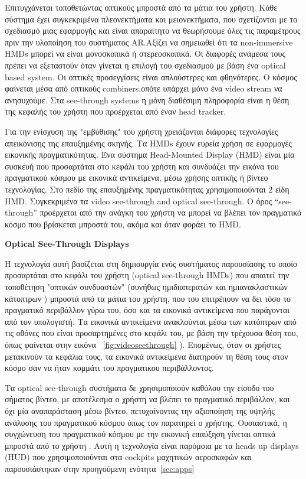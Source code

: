 Επιτυγχάνεται τοποθετώντας οπτικούς μπροστά από τα μάτια του χρήστη. Κάθε σύστημα έχει συγκεκριμένα πλεονεκτήματα και μειονεκτήματα, που σχετίζονται με το σχεδιασμό μιας εφαρμογής και είναι απαραίτητο  να θεωρήσουμε όλες τις παραμέτρους πριν την υλοποίηση του συστήματος AR.Αξίζει να σημειωθεί ότι τα non-immersive HMDs μπορεί να είναι μονοσκοπικά ή στερεοσκοπικά. Οι διαφορές ανάμεσα τους πρέπει να εξεταστούν όταν γίνεται η επιλογή του σχεδιασμού με βάση ένα optical based system. Οι οπτικές προσεγγίσεις είναι απλούστερες και φθηνότερες. Ο κόσμος φαίνεται μέσα από οπτικούς combiners,οπότε υπάρχει μόνο ένα video stream να ανησυχούμε. Στα see-through systems η μόνη διαθέσιμη πληροφορία είναι η θέση της κεφαλής του χρήστη που προέρχεται από έναν head tracker. 



Για την ενίσχυση της "εμβύθισης" του χρήστη χρειάζονται διάφορες τεχνολογίες απεικόνισης της επαυξημένης σκηνής. Τα HMDs έχουν ευρεία χρήση σε εφαρμογές εικονικής πραγματικότητας. Ένα σύστημα Head-Mounted Display (HMD) είναι μία συσκευή που προσαρτάται στο κεφάλι του χρήστη και συνδυάζει την εικόνα του πραγματικού κόσμου με εικονικά αντικείμενα, μέσω χρήσης οπτικής ή βίντεο τεχνολογίας. 
Στο πεδίο της επαυξημένης πραγματικότητας χρησιμοποιούνται 2 είδη HMD. Συγκεκριμένα τα video see-through and optical see-through. Ο όρος “see-through” προέρχεται από την ανάγκη του χρήστη να μπορεί να βλέπει τον πραγματικό κόσμο που βρίσκεται μπροστά του, ακόμα και όταν φοράει το HMD.

 
\textbf{Optical See-Through Displays}


Η τεχνολογία αυτή βασίζεται στη δημιουργία ενός συστήματος παρουσίασης το οποίο προσαρτάται στο κεφάλι του χρήστη (optical see-through HMDs) που απαιτεί την τοποθέτηση "οπτικών συνδυαστών" (συνήθως ημιδιαπερατών και ημιανακλαστικών κάτοπτρων ) μπροστά από τα μάτια του χρήστη, που του επιτρέπουν να δει τόσο το πραγματικό περιβάλλον γύρω του, όσο και τα εικονικά αντικείμενα που παράγονται από τον υπολογιστή. 
Τα εικονικά αντικείμενα ανακλούνται μέσω των κατόπτρων από τις οθόνες που είναι προσαρτημένες στο κεφάλι του, με βάση την τρέχουσα θέση του, όπως φαίνεται στην εικόνα ~\ref{fig:videoseethrough} ).  Επομένως, όταν οι χρήστες μετακινούν τα κεφάλια τους, τα εικονικά αντικείμενα διατηρούν τη θέση τους στον κόσμο σαν να ήταν κομμάτι του πραγματικου περιβάλλοντος.



Τα optical see-through συστήματα δε χρησιμοποιούν καθόλου την είσοδο του σήματος βίντεο, με αποτέλεσμα ο χρήστη να βλέπει το πραγματικό περιβάλλον, και όχι μία αναπαράσταση μέσω βίντεο, πετυχαίνοντας την αξιοποίηση της υψηλής ανάλυσης του πραγματικού κόσμου όπως τον παρατηρεί ο χρήστης. Ουσιαστικά, η συγχώνευση του πραγματικού κόσμου με την εικονική επαύξηση γίνεται οπτικά μπροστά από το χρήστη \cite{Vallino1998} . Αυτή η τεχνολογία είναι παρόμοια με τα  heads up displays (HUD) που χρησιμοποιούνται στα cockpits μαχητικών αεροσκαφών και παρουσιάστηκαν στην προηγούμενη ενότητα~\ref{sec:apps}

